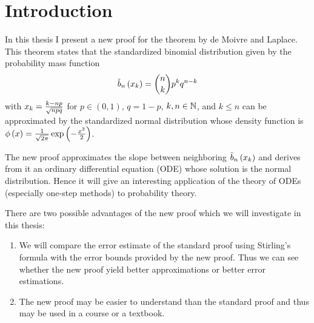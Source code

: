 \chapter{Introduction}

In this thesis I present a new proof for the theorem by de Moivre and Laplace. This theorem states that the standardized binomial distribution given by the probability mass function
\begin{align}
  \bb{\x} = \binom nk p^k q^{n-k}
\end{align}
with $\x[k] = \frac{k-np}{\sqrt{npq}}$ for $p\in (0,1)$, $q=1-p$, $k,n\in\N$, and $k\le n$ can be approximated by the standardized normal distribution whose density function is $\fphi{x} = \frac{1}{\sqrt {2\pi}} \fexp{-\frac{x^2}2}$.

The new proof approximates the slope between neighboring $\bb{\x}$ and derives from it an ordinary differential equation (ODE) whose solution is the normal distribution. Hence it will give an interesting application of the theory of ODEs (especially one-step methods) to probability theory.

There are two possible advantages of the new proof which we will investigate in this thesis:

\begin{enumerate}
  \item We will compare the error estimate of the standard proof using Stirling's formula with the error bounds provided by the new proof. Thus we can see whether the new proof yield better approximations or better error estimations.

  \item The new proof may be easier to understand than the standard proof and thus may be used in a course or a textbook.
\end{enumerate}
